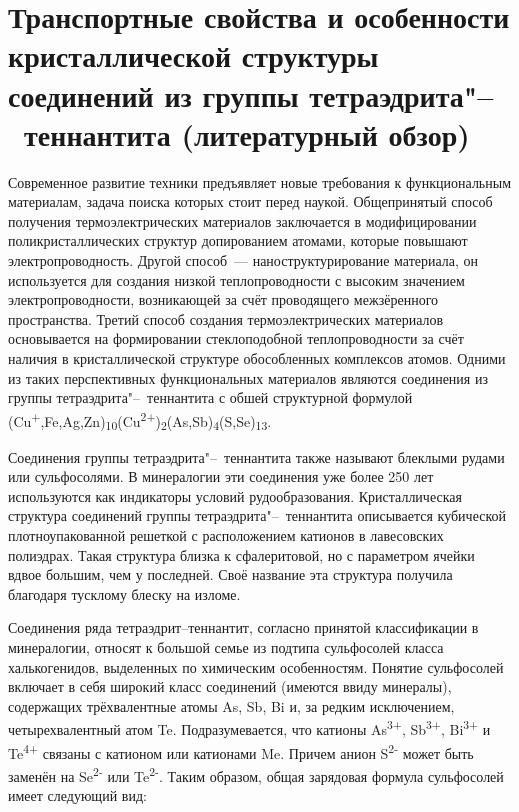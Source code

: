 \chapter{Транспортные свойства и особенности кристаллической структуры соединений из группы тетраэдрита"--~теннантита (литературный обзор)} \label{chapt1}

Современное развитие техники предъявляет новые требования к функциональным материалам, задача поиска которых стоит перед наукой. Общепринятый способ получения термоэлектрических материалов заключается в модифицировании поликристаллических структур допированием атомами, которые повышают электропроводность. Другой способ~--- наноструктурирование материала, он используется для создания низкой теплопроводности с высоким значением электропроводности, возникающей за счёт проводящего межзёренного пространства. Третий способ создания термоэлектрических материалов основывается на формировании стеклоподобной теплопроводности за счёт наличия в кристаллической структуре обособленных комплексов атомов. Одними из таких перспективных функциональных материалов являются соединения из группы тетраэдрита"--~теннантита с обшей структурной формулой (Cu\textsuperscript{+},Fe,Ag,Zn)\textsubscript{10}(Cu\textsuperscript{2+})\textsubscript{2}(As,Sb)\textsubscript{4}(S,Se)\textsubscript{13}.

Соединения группы тетраэдрита"--~теннантита также называют блеклыми рудами или сульфосолями. В минералогии эти соединения уже более 250 лет используются как индикаторы условий рудообразования. Кристаллическая структура соединений группы тетраэдрита"--~теннантита описывается кубической плотноупакованной решеткой с расположением катионов в лавесовских полиэдрах. Такая структура близка к сфалеритовой, но с параметром ячейки вдвое большим, чем у последней. Своё название эта структура получила благодаря тусклому блеску на изломе.

Соединения ряда тетраэдрит--теннантит, согласно принятой классификации в минералогии\cite{Molo2008}, относят к большой семье из подтипа сульфосолей класса халькогенидов, выделенных по химическим особенностям.
Понятие сульфосолей включает в себя широкий класс соединений (имеются ввиду минералы), содержащих трёхвалентные атомы As, Sb, Bi и, за редким исключением, четырехвалентный атом Te.
Подразумевается, что катионы As\textsuperscript{3+}, Sb\textsuperscript{3+}, Bi\textsuperscript{3+} и Te\textsuperscript{4+} связаны с катионом или катионами Me.
Причем анион  S\textsuperscript{2-} может быть заменён на Se\textsuperscript{2-} или Te\textsuperscript{2-}. Таким образом, общая зарядовая формула сульфосолей имеет следующий вид:

